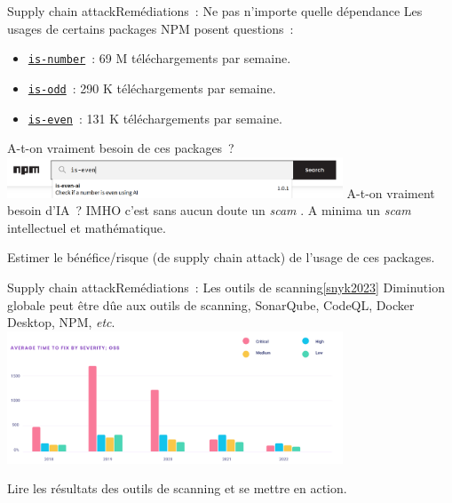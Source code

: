 \documentclass{beamer}
\begin{document}
    \begin{frame}{Supply chain attack}{Remédiations~: Ne pas  n'importe quelle dépendance}
        Les usages de certains packages NPM posent questions~:
        \begin{itemize}
            \item \href{https://www.npmjs.com/package/is-number}{\lstinline{is-number}}~: 69 M téléchargements par semaine.
            \item \href{https://www.npmjs.com/package/is-odd}{\lstinline{is-odd}}~: 290 K téléchargements par semaine.
            \item \href{https://www.npmjs.com/package/is-even}{\lstinline{is-even}}~: 131 K téléchargements par semaine.
        \end{itemize}
        A-t-on vraiment besoin de ces packages~?
        \bigbreak
        \centering
        \includegraphics[width=10cm]{image/ai-everywhere}
        \flushleft
        \bigbreak
        A-t-on vraiment besoin d'IA~?
        \bigbreak
        IMHO c'est sans aucun doute un \textit{scam} .
        A minima un \textit{scam} intellectuel et mathématique.
        \begin{dangercolorbox}
            Estimer le bénéfice/risque (de supply chain attack) de l'usage de ces packages.
        \end{dangercolorbox}
    \end{frame}

    \begin{frame}{Supply chain attack}{Remédiations~: Les outils de scanning\cref{snyk2023}}
        Diminution globale peut être dûe aux outils de scanning, SonarQube, CodeQL, Docker Desktop, NPM, \textit{etc}.
        \bigbreak
        \centering
        \includegraphics[width=10cm]{image/vuln-time-to-fix}
        \flushleft
        \begin{dangercolorbox}
            Lire les résultats des outils de scanning et se mettre en action.
        \end{dangercolorbox}
    \end{frame}
\end{document}
